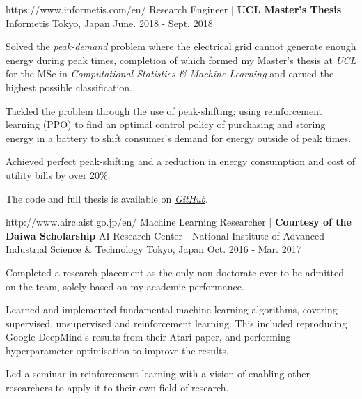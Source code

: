\begin{cventries}
  \cventry
    {https://www.informetis.com/en/}
    {Research Engineer | \textbf{UCL Master's Thesis}} %
    {Informetis} %
    {Tokyo, Japan} %
    {June. 2018 - Sept. 2018} %
    {
      \begin{cvitems} %
        \item {Solved the \emph{peak-demand} problem where the electrical grid cannot generate enough energy during peak times, completion of which formed my Master's thesis at \emph{UCL} for the MSc in \emph{Computational Statistics \& Machine Learning} and earned the highest possible classification.}
        \item {Tackled the problem through the use of peak-shifting; using reinforcement learning (PPO) to find an optimal control policy of purchasing and storing energy in a battery to shift consumer's demand for energy outside of peak times.}
        \item {Achieved perfect peak-shifting and a reduction in energy consumption and cost of utility bills by over 20\%.}
        \item {The code and full thesis is available on \href{https://github.com/KeirSimmons/RL-Optimal-Peak-Shift}{\emph{GitHub}}.} 
      \end{cvitems}
    }

  \cventry
    {http://www.airc.aist.go.jp/en/}
    {Machine Learning Researcher | \textbf{Courtesy of the Daiwa Scholarship}} %
    {AI Research Center - National Institute of Advanced Industrial Science \& Technology} %
    {Tokyo, Japan} %
    {Oct. 2016 - Mar. 2017} %
    {
      \begin{cvitems} %
        \item {Completed a research placement as the only non-doctorate ever to be admitted on the team, solely based on my academic performance.}
        \item {Learned and implemented fundamental machine learning algorithms, covering supervised, unsupervised and reinforcement learning. This included reproducing Google DeepMind's results from their Atari paper, and performing hyperparameter optimisation to improve the results.}
        \item {Led a seminar in reinforcement learning with a vision of enabling other researchers to apply it to their own field of research.}
      \end{cvitems}
    }


\end{cventries}
